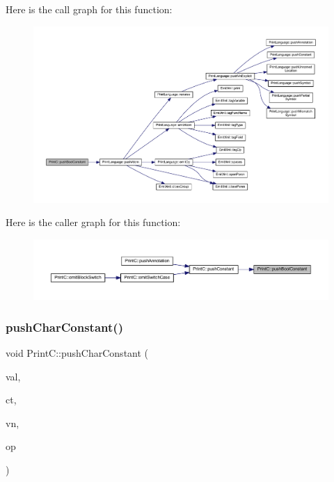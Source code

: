 Here is the call graph for this function\+:
\nopagebreak
\begin{figure}[H]
\begin{center}
\leavevmode
\includegraphics[width=350pt]{class_print_c_a735ddb9bb724110dbd9d1e3b5e381b6d_cgraph}
\end{center}
\end{figure}
Here is the caller graph for this function\+:
\nopagebreak
\begin{figure}[H]
\begin{center}
\leavevmode
\includegraphics[width=350pt]{class_print_c_a735ddb9bb724110dbd9d1e3b5e381b6d_icgraph}
\end{center}
\end{figure}
\mbox{\label{class_print_c_aefb75360529072c8623858fd8c909ca3}} 
\subsubsection{\texorpdfstring{pushCharConstant()}{pushCharConstant()}}
{\footnotesize\ttfamily void Print\+C\+::push\+Char\+Constant (\begin{DoxyParamCaption}\item[{\mbox{\hyperlink{types_8h_a2db313c5d32a12b01d26ac9b3bca178f}{uintb}}}]{val,  }\item[{const \mbox{\hyperlink{class_type_char}{Type\+Char}} $\ast$}]{ct,  }\item[{const \mbox{\hyperlink{class_varnode}{Varnode}} $\ast$}]{vn,  }\item[{const \mbox{\hyperlink{class_pcode_op}{Pcode\+Op}} $\ast$}]{op }\end{DoxyParamCaption})\hspace{0.3cm}{\ttfamily [protected]}}



